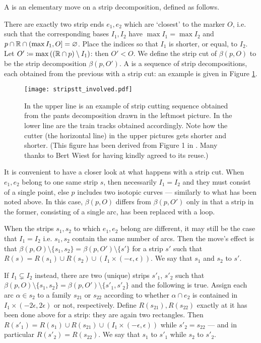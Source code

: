 A  is an elementary move on a strip decomposition, defined as follows.

There are exactly two strip ends $e_1,e_2$ which are `closest' to the marker $O$, i.e. such that the corresponding bases $I_1,I_2$ have $\max I_1=\max I_2$ and $p\cap\mathbb R \cap (\max I_1,O]=\varnothing$. Place the indices so that $I_1$ is shorter, or equal, to $I_2$. Let $O'\coloneqq \max \left((\mathbb R\cap p)\setminus I_1\right)$: then $O'<O$. We define the strip cut of $\beta(p,O)$ to be the strip decomposition $\beta(p,O')$. A  is a sequence of strip decompositions, each obtained from the previous with a strip cut: an example is given in Figure \ref{fig:stripcut}.

\begin{figure}
\texttt{[image: stripstt\_involved.pdf]}
\caption{\label{fig:stripcut}In the upper line is an example of strip cutting sequence obtained from the pants decomposition drawn in the leftmost picture. In the lower line are the train tracks obtained accordingly. Note how the cutter (the horizontal line) in the upper pictures gets shorter and shorter. (This figure has been derived from Figure 1 in \cite{dynnikovwiest}. Many thanks to Bert Wiest for having kindly agreed to its reuse.)}
\end{figure}

It is convenient to have a closer look at what happens with a strip cut. When $e_1,e_2$ belong to one same strip $s$, then necessarily $I_1=I_2$ and they must consist of a single point, else $p$ includes two isotopic curves --- similarly to what has been noted above. In this case, $\beta(p,O)$ differs from $\beta(p,O')$ only in that a strip in the former, consisting of a single arc, has been replaced with a loop.

When the strips $s_1,s_2$ to which $e_1,e_2$ belong are different, it may still be the case that $I_1=I_2$ i.e. $s_1,s_2$ contain the same number of arcs. Then the move's effect is that $\beta(p,O)\setminus\{s_1,s_2\}=\beta(p,O')\setminus\{s'\}$ for a strip $s'$ such that $R(s)=R(s_1)\cup R(s_2)\cup \left(I_1\times (-\epsilon,\epsilon)\right)$. We say that $s_1$ and $s_2$  to $s'$.

If $I_1\subsetneq I_2$ instead, there are two (unique) strips $s'_1$, $s'_2$ such that $\beta(p,O)\setminus\{s_1,s_2\}=\beta(p,O')\setminus\{s'_1,s'_2\}$ and the following is true. Assign each arc $\alpha\in s_2$ to a family $s_{21}$ or $s_{22}$ according to whether $\alpha\cap e_2$ is contained in $I_1\times (-2\epsilon,2\epsilon)$ or not, respectively. Define $R(s_{21}),R(s_{22})$ exactly at it has been done above for a strip: they are again two rectangles. Then $R(s'_1)=R(s_1)\cup R(s_{21})\cup \left(I_1\times (-\epsilon,\epsilon)\right)$ while $s'_2=s_{22}$ --- and in particular $R(s'_2)=R(s_{22})$. We say that $s_1$  to $s'_1$ while $s_2$  to $s'_2$.

